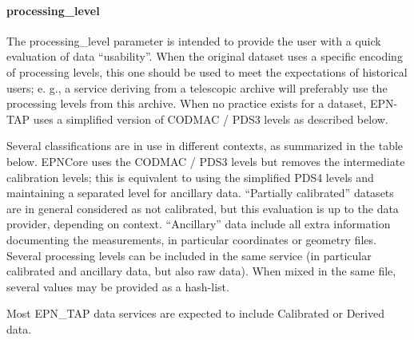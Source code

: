 \documentclass[11pt,a4paper]{ivoa}
\begin{document}
\paragraph{processing\_level}

The processing\_level parameter is intended to provide the user with a quick evaluation of data ``usability''. When the original dataset uses a specific encoding of processing levels, this one should be used to meet the expectations of historical users; e. g., a service deriving from a telescopic archive will preferably use the processing levels from this archive. When no practice exists for a dataset, EPN-TAP uses a simplified version of CODMAC / PDS3 levels as described below.

Several classifications are in use in different contexts, as summarized in the table below.  EPNCore uses the CODMAC / PDS3 levels but removes the intermediate calibration levels; this is equivalent to using the simplified PDS4 levels and maintaining a separated level for ancillary data. ``Partially calibrated'' datasets are in general considered as not calibrated, but this evaluation is up to the data provider, depending on context. ``Ancillary'' data include all extra information documenting the measurements, in particular coordinates or geometry files. Several processing levels can be included in the same service (in particular calibrated and ancillary data, but also raw data). When mixed in the same file, several values may be provided as a hash-list.

Most EPN\_TAP data services are expected to include Calibrated or Derived data. 
\end{document}
